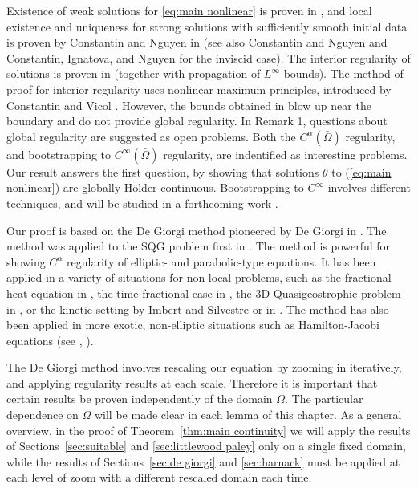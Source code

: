\vskip0.3cm
Existence of weak solutions for \eqref{eq:main nonlinear}  is proven in \cite{CoIg.fraclap}, and local existence and uniqueness for strong solutions with sufficiently smooth initial data is proven by Constantin and Nguyen in \cite{CoNg.strong} (see also Constantin and Nguyen \cite{CoNg} and Constantin, Ignatova, and Nguyen \cite{CoIgNg} for the inviscid case). The interior regularity of solutions  is proven in \cite{CoIg.sqg} (together with propagation of $L^\infty$ bounds).  The method of proof for interior regularity uses  nonlinear maximum principles, introduced by Constantin and Vicol \cite{CoVi}.   However, the bounds obtained in \cite{CoIg.sqg} blow up near the boundary and do not provide global regularity.
  In \cite{CoIg.sqg} Remark 1, questions about   global regularity are suggested as  open problems.  Both the $C^\alpha(\bar{\Omega})$ regularity,  and bootstrapping to  $C^\infty(\bar{\Omega})$ regularity, are indentified as interesting problems.  
  Our  result answers the first question, by  showing  that solutions $\theta$ to (\ref{eq:main nonlinear}) are globally H\"{o}lder continuous.
  Bootstrapping to $C^\infty$ involves different techniques, and will be studied in a forthcoming work \cite{StVa.higher}.  
\vskip0.3cm

Our proof is based on  the De Giorgi method pioneered by De Giorgi in \cite{DG}.  The method was applied to the SQG problem first in \cite{CaVa.sqg}.  The method is powerful for showing $C^\alpha$ regularity of elliptic- and parabolic-type equations. It has been applied in a variety of situations for non-local problems, such as the fractional heat equation in \cite{CaChVa.nio}, the time-fractional case in \cite{AlCaVa}, the 3D Quasigeostrophic problem in \cite{NoVa.qg}, or the kinetic setting by Imbert and Silvestre \cite{ImSi} or in \cite{St.hypo}.  The method has also been applied in more exotic, non-elliptic situations such as Hamilton-Jacobi equations (see \cite{ChVa}, \cite{StVa.hamjac}).  

The De Giorgi method involves rescaling our equation by zooming in iteratively, and applying regularity results at each scale.  Therefore it is important that certain results be proven independently of the domain $\Omega$.  
The particular dependence on $\Omega$ will be made clear in each lemma of this chapter.  
As a general overview, in the proof of Theorem~\ref{thm:main continuity} we will apply the results of Sections~\ref{sec:suitable} and \ref{sec:littlewood paley} only on a single fixed domain, while the results of Sections~\ref{sec:de giorgi} and \ref{sec:harnack} must be applied at each level of zoom with a different rescaled domain each time.  

